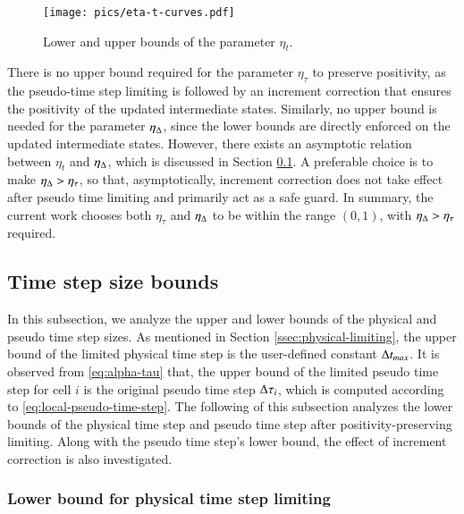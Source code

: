 \begin{figure}[htbp!]
    \centering
    \texttt{[image: pics/eta-t-curves.pdf]}
    \caption{Lower and upper bounds of the parameter $\eta_t$.}
    \label{fig:eta-t-curves}
\end{figure}

There is no upper bound required for the parameter $\eta_\tau$ to preserve positivity, 
as the pseudo-time step limiting is followed by an increment correction 
that ensures the positivity of the updated intermediate states. 
Similarly, no upper bound is needed for the parameter $\eta_{\mathrm\Delta}$, 
since the lower bounds are directly enforced on the updated intermediate states. 
However, there exists an asymptotic relation between $\eta_t$ and $\eta_\mathrm\Delta$,
which is discussed in Section \ref{ssec:analysis-time-step}.
A preferable choice is to make $\eta_\mathrm\Delta > \eta_\tau$, so that,
asymptotically, increment correction does not take effect after 
pseudo time limiting and primarily act as a safe guard.
In summary, the current work 
chooses both $\eta_\tau$ and $\eta_{\mathrm\Delta}$ to be within the range $(0,1)$, 
with $\eta_\mathrm\Delta > \eta_\tau$ required. 

\subsection{Time step size bounds}
\label{ssec:analysis-time-step}
In this subsection, we analyze the upper and lower bounds of the physical and pseudo time step sizes. As mentioned in Section \ref{ssec:physical-limiting}, the upper bound of the limited physical time step is the user-defined constant $\mathrm\Delta t_{max}$.
It is observed from \eqref{eq:alpha-tau} that, the upper bound of the limited pseudo time step for cell $i$ is the original pseudo time step $\mathrm\Delta \tau_i$, which is computed according to \eqref{eq:local-pseudo-time-step}. 
The following of this subsection analyzes the lower bounds
of the physical time step and pseudo time step after positivity-preserving limiting. 
Along with the pseudo time step's lower bound, the effect of 
increment correction is also investigated.

\subsubsection{Lower bound for physical time step limiting}

